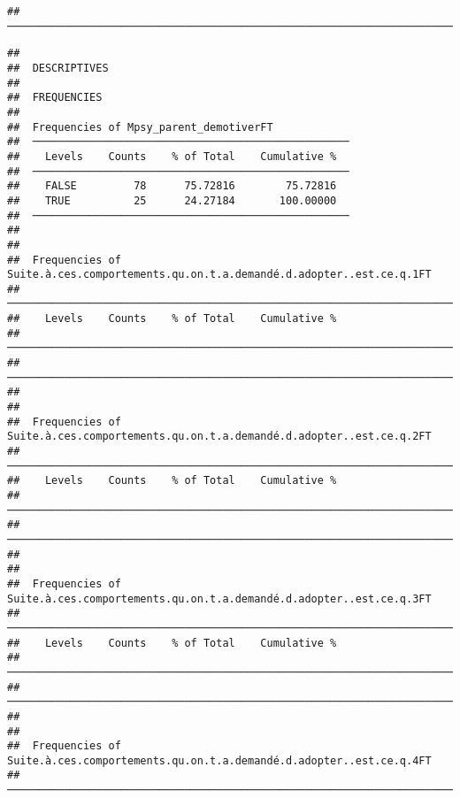 \documentclass[
]{article}
\begin{document}
\begin{verbatim}
##  ─────────────────────────────────────────────────────────────────────────────────────────────────────────────────────────────────────────────────────────────────────────────────────────────────────────────────────────────────────────────────────────────────────────────────────────────────────────────────────────────────────────────────────────────────────────────────────────────────────────────────────────────────────────────────────────────────────────────────────────────────────────────────────────────────────────────────────────────────────────────────────────────────────────────────────────────────────────────────────────────────────────────────
\end{verbatim}

\begin{verbatim}
## 
##  DESCRIPTIVES
## 
##  FREQUENCIES
## 
##  Frequencies of Mpsy_parent_demotiverFT             
##  ────────────────────────────────────────────────── 
##    Levels    Counts    % of Total    Cumulative %   
##  ────────────────────────────────────────────────── 
##    FALSE         78      75.72816        75.72816   
##    TRUE          25      24.27184       100.00000   
##  ────────────────────────────────────────────────── 
## 
## 
##  Frequencies of Suite.à.ces.comportements.qu.on.t.a.demandé.d.adopter..est.ce.q.1FT 
##  ────────────────────────────────────────────────────────────────────────────────── 
##    Levels    Counts    % of Total    Cumulative %   
##  ────────────────────────────────────────────────────────────────────────────────── 
##  ────────────────────────────────────────────────────────────────────────────────── 
## 
## 
##  Frequencies of Suite.à.ces.comportements.qu.on.t.a.demandé.d.adopter..est.ce.q.2FT 
##  ────────────────────────────────────────────────────────────────────────────────── 
##    Levels    Counts    % of Total    Cumulative %   
##  ────────────────────────────────────────────────────────────────────────────────── 
##  ────────────────────────────────────────────────────────────────────────────────── 
## 
## 
##  Frequencies of Suite.à.ces.comportements.qu.on.t.a.demandé.d.adopter..est.ce.q.3FT 
##  ────────────────────────────────────────────────────────────────────────────────── 
##    Levels    Counts    % of Total    Cumulative %   
##  ────────────────────────────────────────────────────────────────────────────────── 
##  ────────────────────────────────────────────────────────────────────────────────── 
## 
## 
##  Frequencies of Suite.à.ces.comportements.qu.on.t.a.demandé.d.adopter..est.ce.q.4FT 
##  ────────────────────────────────────────────────────────────────────────────────── 

\end{verbatim}
\end{document}

